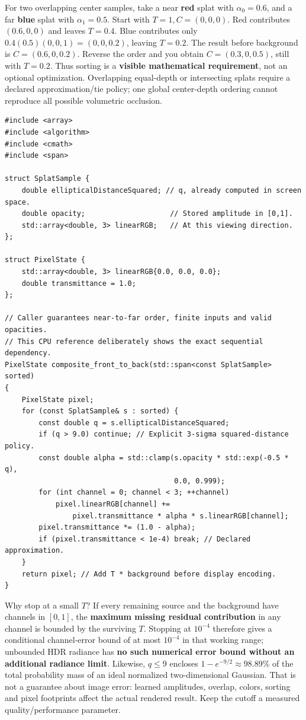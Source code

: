 For two overlapping center samples, take a near \textbf{red} splat with \(\alpha_0=0.6\), and a far \textbf{blue} splat with \(\alpha_1=0.5\). Start with \(T=1,C=(0,0,0)\). Red contributes \((0.6,0,0)\) and leaves \(T=0.4\). Blue contributes only \(0.4(0.5)(0,0,1)=(0,0,0.2)\), leaving \(T=0.2\). The result before background is \(C=(0.6,0,0.2)\). Reverse the order and you obtain \(C=(0.3,0,0.5)\), still with \(T=0.2\). Thus sorting is a \textbf{visible mathematical requirement}, not an optional optimization. Overlapping equal-depth or intersecting splats require a declared approximation/tie policy; one global center-depth ordering cannot reproduce all possible volumetric occlusion.

\begin{verbatim}
#include <array>
#include <algorithm>
#include <cmath>
#include <span>

struct SplatSample {
    double ellipticalDistanceSquared; // q, already computed in screen space.
    double opacity;                    // Stored amplitude in [0,1].
    std::array<double, 3> linearRGB;   // At this viewing direction.
};

struct PixelState {
    std::array<double, 3> linearRGB{0.0, 0.0, 0.0};
    double transmittance = 1.0;
};

// Caller guarantees near-to-far order, finite inputs and valid opacities.
// This CPU reference deliberately shows the exact sequential dependency.
PixelState composite_front_to_back(std::span<const SplatSample> sorted)
{
    PixelState pixel;
    for (const SplatSample& s : sorted) {
        const double q = s.ellipticalDistanceSquared;
        if (q > 9.0) continue; // Explicit 3-sigma squared-distance policy.
        const double alpha = std::clamp(s.opacity * std::exp(-0.5 * q),
                                        0.0, 0.999);
        for (int channel = 0; channel < 3; ++channel)
            pixel.linearRGB[channel] +=
                pixel.transmittance * alpha * s.linearRGB[channel];
        pixel.transmittance *= (1.0 - alpha);
        if (pixel.transmittance < 1e-4) break; // Declared approximation.
    }
    return pixel; // Add T * background before display encoding.
}
\end{verbatim}

Why stop at a small \(T\)? If every remaining source and the background have channels in \([0,1]\), the \textbf{maximum missing residual contribution} in any channel is bounded by the surviving \(T\). Stopping at \(10^{-4}\) therefore gives a conditional channel-error bound of at most \(10^{-4}\) in that working range; unbounded HDR radiance has \textbf{no such numerical error bound without an additional radiance limit}. Likewise, \(q\leq9\) encloses \(1-e^{-9/2}\approx98.89\%\) of the total probability mass of an ideal normalized two-dimensional Gaussian. That is not a guarantee about image error: learned amplitudes, overlap, colors, sorting and pixel footprints affect the actual rendered result. Keep the cutoff a measured quality/performance parameter.

